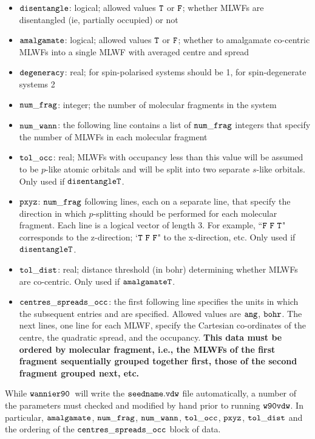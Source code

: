 \documentclass{report}
\newcommand{\wvdw}{{$\tt{w90vdw}$}}
\newcommand{\wannier}{{$\tt{wannier90}$}}
\begin{document}
\begin{itemize}
\item $\tt{disentangle}$: logical; allowed values $\tt{T}$ or
  $\tt{F}$; whether MLWFs are disentangled (ie, partially occupied) or
  not
\item $\tt{amalgamate}$: logical; allowed values $\tt{T}$ or
  $\tt{F}$; whether to amalgamate co-centric MLWFs into a single MLWF
  with averaged centre and spread 
\item $\tt{degeneracy}$: real; for spin-polarised systems should be 1,
  for spin-degenerate systems 2
\item $\tt{num\_frag}$: integer; the number of molecular fragments in
    the system
\item $\tt{num\_wann}$: the following line contains 
  a list of $\tt{num\_frag}$ integers that
  specify the number of MLWFs in each molecular fragment
\item $\tt{tol\_occ}$: real; MLWFs with occupancy less than this value
  will be assumed to be $p$-like atomic orbitals and will be split
  into two separate $s$-like orbitals. Only used if $\tt{disentangle
    T}$. 
\item $\tt{pxyz}$: $\tt{num\_frag}$ following lines,
  each on a separate line, that specify the direction in which
  $p$-splitting should be performed for each molecular fragment. Each line
  is a logical vector of length 3. For example,  
  ``$\tt{F\ F\ T}$" corresponds to the z-direction; `$\tt{T\ F\ F}$" to the x-direction,
  etc. Only used if $\tt{disentangle
    T}$.
\item $\tt{tol\_dist}$: real; distance threshold (in bohr) determining whether
  MLWFs are co-centric. Only used if $\tt{amalgamate T}$.
\item $\tt{centres\_spreads\_occ}$: the first following line 
   specifies the units in which the subsequent entries
  and are specified. Allowed values are $\tt{ang}$,
  $\tt{bohr}$. The next lines, one line for each MLWF,
  specify the Cartesian co-ordinates of the centre, the quadratic
  spread, and the occupancy. \textbf{This data must be ordered by molecular
    fragment, i.e., the MLWFs of the first fragment sequentially grouped together
    first, those of the second fragment grouped next, etc.}
\end{itemize}

While \wannier\ will write the $\tt{seedname.vdw}$ file
automatically, a number of the parameters must checked and modified by hand
prior to running \wvdw. In particular, $\tt{amalgamate}$,
$\tt{num\_frag}$, $\tt{num\_wann}$, $\tt{tol\_occ}$, $\tt{pxyz}$,
  $\tt{tol\_dist}$ and the ordering of the
  $\tt{centres\_spreads\_occ}$ block of data. 
\end{document}
